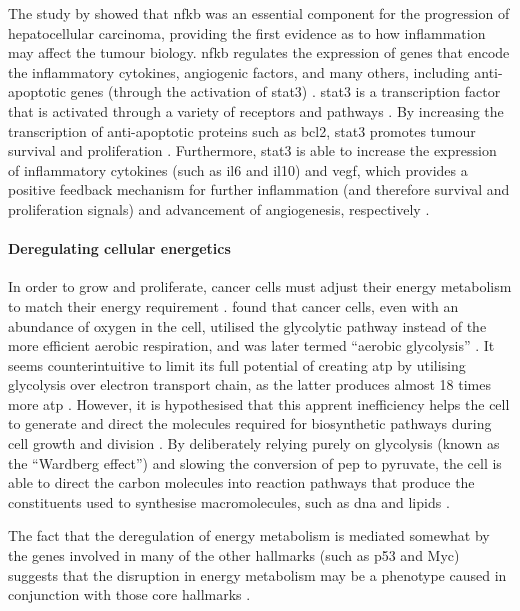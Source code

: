 The study by \citep{Pikarsky2004} showed that \gls{nfkb} was an essential component for the progression of hepatocellular carcinoma, providing the first evidence as to how inflammation may affect the tumour biology.
\gls{nfkb} regulates the expression of genes that encode the inflammatory cytokines, angiogenic factors, and many others, including anti-apoptotic genes (through the activation of \gls{stat3}) \citep{Elinav2013,Mantovani2008}.
\gls{stat3} is a transcription factor that is activated through a variety of receptors and pathways \citep{Yu2007,Yu2014}.
By increasing the transcription of anti-apoptotic proteins such as \gls{bcl2}, \gls{stat3} promotes tumour survival and proliferation \citep{Yu2007}.
Furthermore, \gls{stat3} is able to increase the expression of inflammatory cytokines (such as \gls{il6} and \acrshort{il10}) and \acrshort{vegf}, which provides a positive feedback mechanism for further inflammation (and therefore survival and proliferation signals) and advancement of angiogenesis, respectively \citep{Yu2007}.

\paragraph{Deregulating cellular energetics}

\noindent
In order to grow and proliferate, cancer cells must adjust their energy metabolism to match their energy requirement \citet{Hanahan2011}.
\citet{Wardburg1956} found that cancer cells, even with an abundance of oxygen in the cell, utilised the glycolytic pathway instead of the more efficient aerobic respiration, and was later termed ``aerobic glycolysis'' \citep{Hanahan2011}.
It seems counterintuitive to limit its full potential of creating \gls{atp} by utilising glycolysis over electron transport chain, as the latter produces almost 18 times more \gls{atp} \citep{Hanahan2011, VanderHeiden2009}.
However, it is hypothesised  that this apprent inefficiency helps the cell to generate and direct the molecules required for biosynthetic pathways during cell growth and division \citep{Cairns2011,VanderHeiden2009}.
By deliberately relying purely on glycolysis (known as the ``Wardberg effect'') and slowing the conversion of \gls{pep} to pyruvate, the cell is able to direct the carbon molecules into reaction pathways that produce the constituents used to synthesise macromolecules, such as \acrshort{dna} and lipids \citep{Cairns2011,VanderHeiden2009}.

The fact that the deregulation of energy metabolism is mediated somewhat by the genes involved in many of the other hallmarks (such as p53 and Myc) suggests that the disruption in energy metabolism may be a phenotype caused in conjunction with those core hallmarks \citep{Hanahan2011}.

